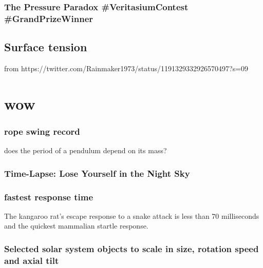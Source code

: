 \documentclass[
  letterpaper,
  DIV=11,
  numbers=noendperiod]{scrreprt}
\begin{document}
\subsection*{The Pressure Paradox \#VeritasiumContest
\#GrandPrizeWinner}\label{the-pressure-paradox-veritasiumcontest-grandprizewinner}

\section*{Surface tension}\label{surface-tension}


from https://twitter.com/Rainmaker1973/status/1191329332926570497?s=09

\chapter*{wow}\label{wow}


\subsection*{rope swing record}\label{rope-swing-record}

does the period of a pendulum depend on its mass?

\subsection*{Time-Lapse: Lose Yourself in the Night
Sky}\label{time-lapse-lose-yourself-in-the-night-sky}

\subsection*{fastest response time}\label{fastest-response-time}

The kangaroo rat's escape response to a snake attack is less than 70
milliseconds and the quickest mammalian startle response.

\subsection*{Selected solar system objects to scale in size, rotation
speed and axial
tilt}\label{selected-solar-system-objects-to-scale-in-size-rotation-speed-and-axial-tilt}
\end{document}
